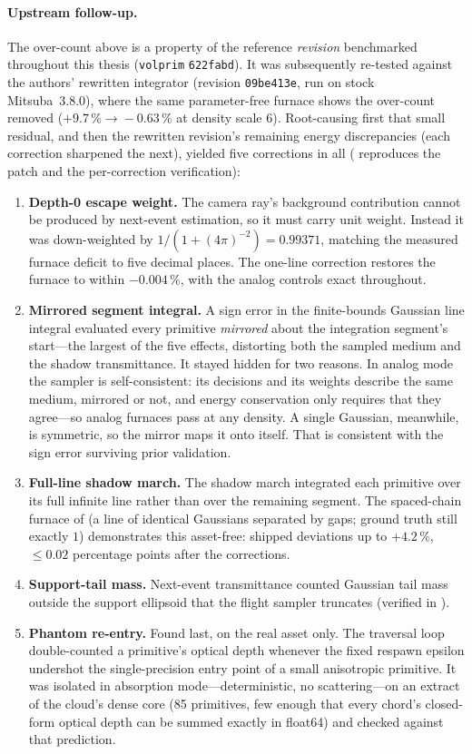 \paragraph{Upstream follow-up.} The over-count above is a property of the reference \emph{revision}
benchmarked throughout this thesis (\texttt{volprim} \texttt{622fabd}). It was subsequently re-tested
against the authors' rewritten integrator (revision \texttt{09be413e}, run on stock Mitsuba~3.8.0),
where the same parameter-free furnace shows the over-count removed ($+9.7\,\%\!\to\!-0.63\,\%$ at
density scale \num{6}). Root-causing first that small residual, and then the rewritten revision's remaining energy
discrepancies (each correction sharpened the next), yielded five
corrections in all ( reproduces the patch and the per-correction verification):
\begin{enumerate}
  \item \textbf{Depth-0 escape weight.} The camera ray's background contribution cannot be produced
  by next-event estimation, so it must carry unit weight. Instead it was down-weighted by
  $1/(1+(4\pi)^{-2})=\num{0.99371}$, matching the measured furnace deficit to five decimal places.
  The one-line correction restores the furnace to within $-0.004\,\%$, with the analog controls
  exact throughout.
  \item \textbf{Mirrored segment integral.} A sign error in the finite-bounds
  Gaussian line integral evaluated every primitive \emph{mirrored} about the integration segment's
  start---the largest of the five effects, distorting both the sampled medium and the shadow
  transmittance. It stayed hidden for two reasons. In analog mode the sampler is
self-consistent: its decisions and its weights describe the same medium, mirrored or not,
and energy conservation only requires that they agree---so analog furnaces pass at any
density. A single Gaussian, meanwhile, is symmetric, so the mirror maps it onto itself. That is consistent with the sign error
  surviving prior validation.
  \item \textbf{Full-line shadow march.} The shadow march integrated each primitive over its
  full infinite line rather than over the remaining segment. The
  spaced-chain furnace of  (a line of identical Gaussians separated by
  gaps; ground truth still exactly $1$) demonstrates this asset-free: shipped deviations
  up to $+4.2\,\%$, ${\le}0.02$ percentage points after the corrections.
  \item \textbf{Support-tail mass.} Next-event transmittance counted Gaussian tail mass outside the
  support ellipsoid that the flight sampler truncates (verified in ).
  \item \textbf{Phantom re-entry.} Found last, on the real asset only. The traversal loop
  double-counted a primitive's optical depth whenever the fixed respawn epsilon undershot the
  single-precision entry point of a small anisotropic primitive. It was isolated in absorption mode---deterministic, no scattering---on an extract of the
cloud's dense core (\num{85} primitives, few enough that every chord's closed-form optical
depth can be summed exactly in float64) and checked against that prediction.
\end{enumerate}
